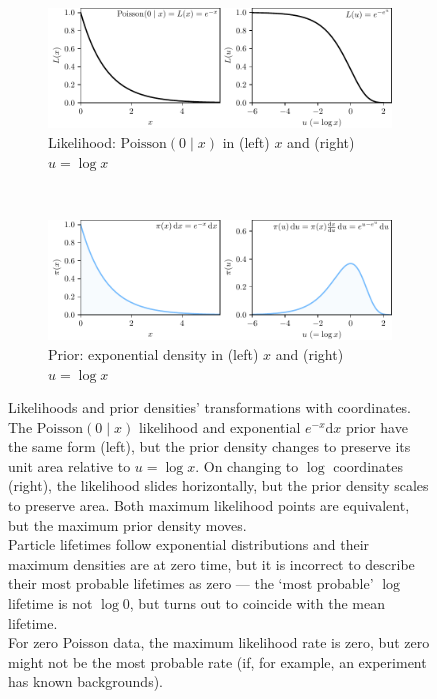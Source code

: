 \begin{figure}[tp]
\centering
\begin{subfigure}{\textwidth}
\centering
\includegraphics[width=\textwidth]{figures/searches_abacus_likelihood.pdf}
\caption{%
Likelihood: $\mathrm{Poisson}(0\mid x)$ in
(left) $x$ and
(right) $u = \log x$%
}
\end{subfigure}
\\[.5em]
\begin{subfigure}{\textwidth}
\centering
\includegraphics[width=\textwidth]{figures/searches_abacus_prior.pdf}
\caption{%
Prior: exponential density in
(left) $x$ and
(right) $u = \log x$%
}
\end{subfigure}
\caption[
Likelihoods and prior densities' transformations with coordinates.
]{%
Likelihoods and prior densities' transformations with coordinates.
The $\mathrm{Poisson}(0\mid x)$ likelihood and exponential $e^{-x}\mathrm{d}x$
prior have the same form (left), but the prior density changes to preserve its unit
area relative to $u = \log x$.
On changing to $\log$ coordinates (right), the likelihood slides horizontally,
but the prior density scales to preserve area.
Both maximum likelihood points are equivalent, but the maximum prior density
moves.
\\[.5em]
Particle lifetimes follow exponential distributions and their maximum
densities are at zero time, but it is incorrect to describe their most probable
lifetimes as zero ---
the `most probable' $\log$ lifetime is not $\log 0$, but turns out to coincide
with the mean lifetime.
\\[.5em]
For zero Poisson data, the maximum likelihood rate is zero, but zero might not
be the most probable rate (if, for example, an experiment has known backgrounds).
}
\label{fig:searches_abacus}
\end{figure}

